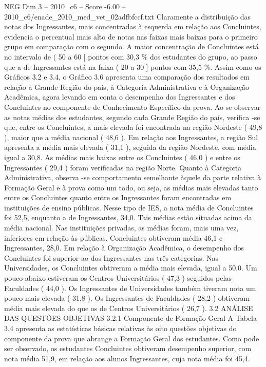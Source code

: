 \begin{textsample}{NEG Dim 3 – 2010\_c6 – Score -6.00 – 2010\_c6/enade\_2010\_med\_vet\_02adfbfccf.txt}
Claramente a distribuição das notas dos Ingressantes, mais concentradas à esquerda em relação aos Concluintes, evidencia o percentual mais alto de notas nas faixas mais baixas para o primeiro grupo em comparação com o segundo.
A maior concentração de Concluintes está no intervalo de ( 50 a 60 ] pontos com 30,3 \% dos estudantes do grupo, ao passo que a de Ingressantes está na faixa ( 20 a 30 ] pontos com 35,5 \%.
Assim como os Gráficos 3.2 e 3.4, o Gráfico 3.6 apresenta uma comparação dos resultados em relação à Grande Região do país, à Categoria Administrativa e à Organização Acadêmica, agora levando em conta o desempenho dos Ingressantes e dos Concluintes no componente de Conhecimento Específico da prova.
Ao se observar as notas médias dos estudantes, segundo cada Grande Região do país, verifica -se que, entre os Concluintes, a mais elevada foi encontrada na região Nordeste ( 49,8 ), maior que a média nacional ( 48,6 ).
Em relação aos Ingressantes, a região Sul apresenta a média mais elevada ( 31,1 ), seguida da região Nordeste, com média igual a 30,8.
As médias mais baixas entre os Concluintes ( 46,0 ) e entre os Ingressantes ( 29,4 ) foram verificadas na região Norte.
Quanto à Categoria Administrativa, observa -se comportamento semelhante àquele da parte relativa à Formação Geral e à prova como um todo, ou seja, as médias mais elevadas tanto entre os Concluintes quanto entre os Ingressantes foram encontradas em instituições de ensino públicas.
Nesse tipo de IES, a nota média de Concluintes foi 52,5, enquanto a de Ingressantes, 34,0.
Tais médias estão situadas acima da média nacional.
Nas instituições privadas, as médias foram, mais uma vez, inferiores em relação às públicas.
Concluintes obtiveram média 46,1 e Ingressantes, 28,0.
Em relação à Organização Acadêmica, o desempenho dos Concluintes foi superior ao dos Ingressantes nas três categorias.
Nas Universidades, os Concluintes obtiveram a média mais elevada, igual a 50,0.
Um pouco abaixo estiveram os Centros Universitários ( 47,3 ) seguidos pelas Faculdades ( 44,0 ).
Os Ingressantes de Universidades também tiveram nota um pouco mais elevada ( 31,8 ).
Os Ingressantes de Faculdades ( 28,2 ) obtiveram média mais elevada do que os de Centros Universitários ( 26,7 ). 3.2 ANÁLISE DAS QUESTÕES OBJETIVAS 3.2.1 Componente de Formação Geral A Tabela 3.4 apresenta as estatísticas básicas relativas às oito questões objetivas do componente da prova que abrange a Formação Geral dos estudantes.
Como pode ser observado, os estudantes Concluintes obtiveram desempenho superior, com nota média 51,9, em relação aos alunos Ingressantes, cuja nota média foi 45,4.

\end{textsample}

